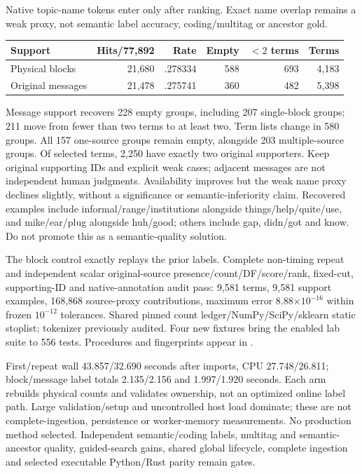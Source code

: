\documentclass[11pt]{article}
\begin{document}
Native topic-name tokens enter only after ranking. Exact name overlap remains
a weak proxy, not semantic label accuracy, coding/multitag or ancestor gold.
\begin{center}
\begin{tabular}{lrrrrr}
Support & Hits/77,892 & Rate & Empty & $<2$ terms & Terms\\
\hline
Physical blocks & 21,680 & .278334 & 588 & 693 & 4,183\\
Original messages & 21,478 & .275741 & 360 & 482 & 5,398\\
\end{tabular}
\end{center}
Message support recovers 228 empty groups, including 207 single-block groups;
211 move from fewer than two terms to at least two. Term lists change in 580
groups. All 157 one-source groups remain empty, alongside 203 multiple-source
groups. Of selected terms, 2,250 have exactly two original supporters. Keep
original supporting IDs and explicit weak cases; adjacent messages are not
independent human judgments. Availability improves but the weak name proxy
declines slightly, without a significance or semantic-inferiority claim.
Recovered examples include informal/range/institutions alongside
things/help/quite/use, and mike/ear/plug alongside huh/good; others include
gap, didn/got and know. Do not promote this as a semantic-quality solution.

The block control exactly replays the prior labels. Complete non-timing repeat
and independent scalar original-source presence/count/DF/score/rank,
fixed-cut, supporting-ID and native-annotation audit pass: 9,581 terms,
9,581 support examples, 168,868 source-proxy contributions, maximum error
8.88$\times10^{-16}$ within frozen $10^{-12}$ tolerances. Shared pinned count
ledger/NumPy/SciPy/sklearn static stoplist; tokenizer previously audited.
Four new fixtures bring the enabled lab suite to 556 tests. Procedures and
fingerprints appear in .

First/repeat wall 43.857/32.690 seconds after imports, CPU 27.748/26.811;
block/message label totals 2.135/2.156 and 1.997/1.920 seconds. Each arm
rebuilds physical counts and validates ownership, not an optimized online
label path. Large validation/setup and uncontrolled host load dominate; these
are not complete-ingestion, persistence or worker-memory measurements. No
production method selected. Independent semantic/coding labels, multitag and
semantic-ancestor quality, guided-search gains, shared global lifecycle,
complete ingestion and selected executable Python/Rust parity remain gates.
\end{document}
